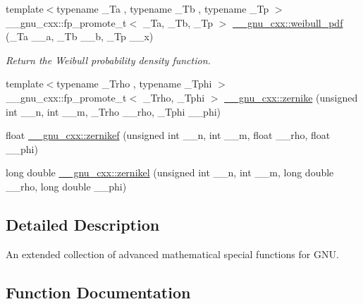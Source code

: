\begin{DoxyCompactItemize}
{\footnotesize template$<$typename \+\_\+\+Ta , typename \+\_\+\+Tb , typename \+\_\+\+Tp $>$ }\\\+\_\+\+\_\+gnu\+\_\+cxx\+::fp\+\_\+promote\+\_\+t$<$ \+\_\+\+Ta, \+\_\+\+Tb, \+\_\+\+Tp $>$ \hyperlink{group__gnu__math__spec__func_gacfbb6ca9df8e0aa092ff4406baff597c}{\+\_\+\+\_\+gnu\+\_\+cxx\+::weibull\+\_\+pdf} (\+\_\+\+Ta \+\_\+\+\_\+a, \+\_\+\+Tb \+\_\+\+\_\+b, \+\_\+\+Tp \+\_\+\+\_\+x)
\begin{DoxyCompactList}\small\item\em Return the Weibull probability density function. \end{DoxyCompactList}\item 
{\footnotesize template$<$typename \+\_\+\+Trho , typename \+\_\+\+Tphi $>$ }\\\+\_\+\+\_\+gnu\+\_\+cxx\+::fp\+\_\+promote\+\_\+t$<$ \+\_\+\+Trho, \+\_\+\+Tphi $>$ \hyperlink{group__gnu__math__spec__func_gaaed33f29c1eb1d2c5b9590fe2e57151c}{\+\_\+\+\_\+gnu\+\_\+cxx\+::zernike} (unsigned int \+\_\+\+\_\+n, int \+\_\+\+\_\+m, \+\_\+\+Trho \+\_\+\+\_\+rho, \+\_\+\+Tphi \+\_\+\+\_\+phi)
\item 
float \hyperlink{group__gnu__math__spec__func_gababce1066ecef7258070b9b7fcea975f}{\+\_\+\+\_\+gnu\+\_\+cxx\+::zernikef} (unsigned int \+\_\+\+\_\+n, int \+\_\+\+\_\+m, float \+\_\+\+\_\+rho, float \+\_\+\+\_\+phi)
\item 
long double \hyperlink{group__gnu__math__spec__func_ga9236dd8545b448da9cb05dd8b7cf6811}{\+\_\+\+\_\+gnu\+\_\+cxx\+::zernikel} (unsigned int \+\_\+\+\_\+n, int \+\_\+\+\_\+m, long double \+\_\+\+\_\+rho, long double \+\_\+\+\_\+phi)
\end{DoxyCompactItemize}


\subsection{Detailed Description}
An extended collection of advanced mathematical special functions for G\+NU. 

\subsection{Function Documentation}
\mbox{\label{group__gnu__math__spec__func_gac84f8c4ad00ee677ad4d0b785925d983}} 
